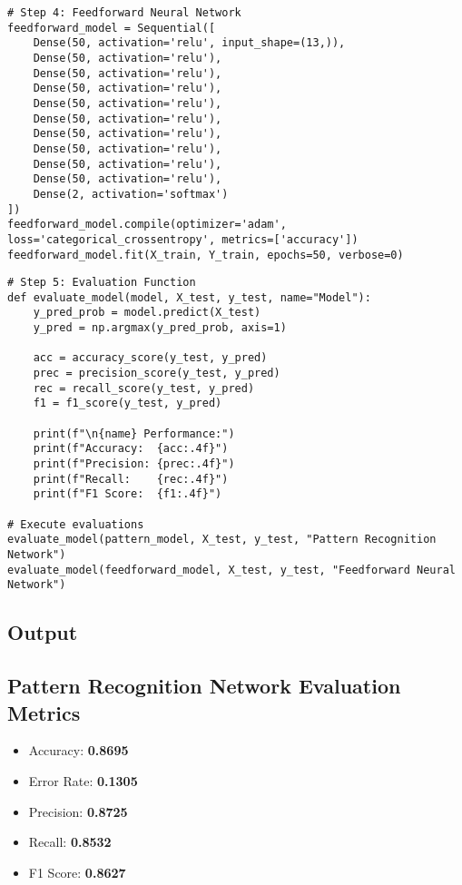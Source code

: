 \documentclass[a4paper,12pt]{article}
\begin{document}
\begin{verbatim}
# Step 4: Feedforward Neural Network
feedforward_model = Sequential([
    Dense(50, activation='relu', input_shape=(13,)),
    Dense(50, activation='relu'),
    Dense(50, activation='relu'),
    Dense(50, activation='relu'),
    Dense(50, activation='relu'),
    Dense(50, activation='relu'),
    Dense(50, activation='relu'),
    Dense(50, activation='relu'),
    Dense(50, activation='relu'),
    Dense(50, activation='relu'),
    Dense(2, activation='softmax')
])
feedforward_model.compile(optimizer='adam', loss='categorical_crossentropy', metrics=['accuracy'])
feedforward_model.fit(X_train, Y_train, epochs=50, verbose=0)
\end{verbatim}

\begin{verbatim}
# Step 5: Evaluation Function
def evaluate_model(model, X_test, y_test, name="Model"):
    y_pred_prob = model.predict(X_test)
    y_pred = np.argmax(y_pred_prob, axis=1)

    acc = accuracy_score(y_test, y_pred)
    prec = precision_score(y_test, y_pred)
    rec = recall_score(y_test, y_pred)
    f1 = f1_score(y_test, y_pred)

    print(f"\n{name} Performance:")
    print(f"Accuracy:  {acc:.4f}")
    print(f"Precision: {prec:.4f}")
    print(f"Recall:    {rec:.4f}")
    print(f"F1 Score:  {f1:.4f}")

# Execute evaluations
evaluate_model(pattern_model, X_test, y_test, "Pattern Recognition Network")
evaluate_model(feedforward_model, X_test, y_test, "Feedforward Neural Network")
\end{verbatim}

\subsection{Output}

\subsection*{Pattern Recognition Network Evaluation Metrics}
\begin{itemize}
    \item Accuracy: \textbf{0.8695}
    \item Error Rate: \textbf{0.1305}
    \item Precision: \textbf{0.8725}
    \item Recall: \textbf{0.8532}
    \item F1 Score: \textbf{0.8627}
\end{itemize}
\end{document}
